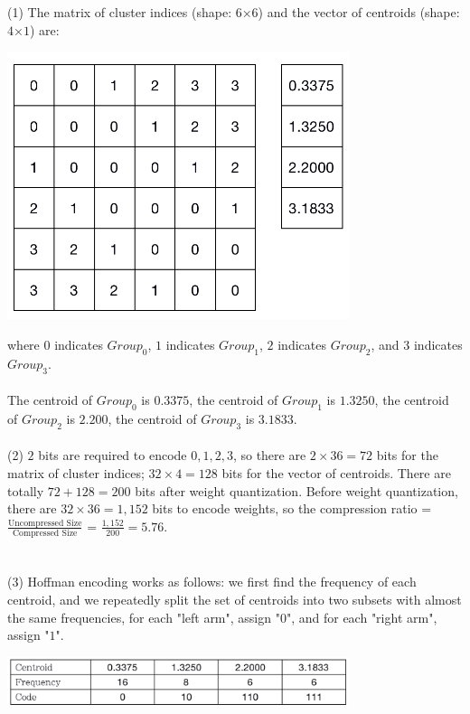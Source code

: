 \documentclass[11pt]{article}
\begin{document}
\begin{solution}
(1) The matrix of cluster indices (shape: $6$×$6$) and the vector of
centroids (shape: $4$×$1$) are:
\begin{center}
\includegraphics[width=10cm]{2_1.png}
\end{center}
where $0$ indicates $Group_0$, $1$ indicates $Group_1$, $2$ indicates $Group_2$, and $3$ indicates $Group_3$.\\
\\
The centroid of $Group_0$ is $0.3375$, the centroid of $Group_1$ is $1.3250$, the centroid of $Group_2$ is $2.200$, the centroid of $Group_3$ is $3.1833$.
\\
\\
(2) $2$ bits are required to encode $0, 1, 2, 3$, so there are $2 \times 36 = 72$ bits for the matrix of cluster indices; $32 \times 4 = 128$ bits for the vector of centroids. There are totally $72 + 128 = 200$ bits after weight quantization. Before weight quantization, there are $32 \times 36 = 1,152$ bits to encode weights, so the compression ratio = $\frac{\text{Uncompressed Size}}{\text{Compressed Size}}$ = $\frac{1,152}{200} = 5.76$. 
\\
\\
\pagebreak \\
(3) Hoffman encoding works as follows: we first find the frequency of each centroid, and we repeatedly split the set of centroids into two subsets with almost the same frequencies, for each "left arm", assign "$0$", and for each "right arm", assign "$1$".
\begin{center}
\includegraphics[width=10cm]{2_3_1.png}

\end{center}
\end{solution}
\end{document}
